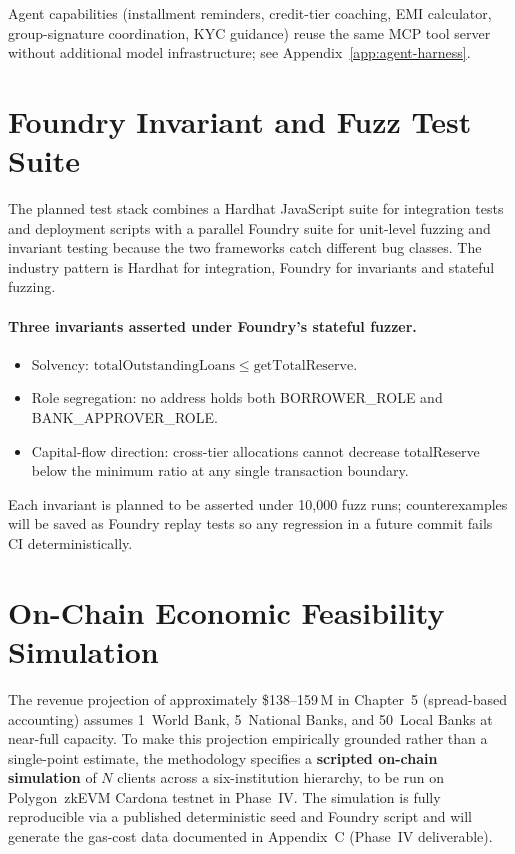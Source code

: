 \documentclass[12pt,a4paper]{report}
\begin{document}
\noindent Agent capabilities (installment reminders, credit-tier coaching, EMI calculator, group-signature coordination, KYC guidance) reuse the same MCP tool server without additional model infrastructure; see Appendix~\ref{app:agent-harness}.

\section{Foundry Invariant and Fuzz Test Suite}
\label{sec:foundry}

The planned test stack combines a Hardhat JavaScript suite for integration tests and deployment scripts with a parallel Foundry suite for unit-level fuzzing and invariant testing because the two frameworks catch different bug classes. The industry pattern is Hardhat for integration, Foundry for invariants and stateful fuzzing.

\paragraph{Three invariants asserted under Foundry's stateful fuzzer.}
\begin{itemize}[noitemsep]
\item Solvency: \(\mathrm{totalOutstandingLoans} \le \mathrm{getTotalReserve}\).
\item Role segregation: no address holds both BORROWER\_ROLE and BANK\_APPROVER\_ROLE.
\item Capital-flow direction: cross-tier allocations cannot decrease totalReserve below the minimum ratio at any single transaction boundary.
\end{itemize}

Each invariant is planned to be asserted under 10{,}000 fuzz runs; counterexamples will be saved as Foundry replay tests so any regression in a future commit fails CI deterministically.

\section{On-Chain Economic Feasibility Simulation}
\label{sec:abm-sim}

The revenue projection of approximately \$138--159\,M in Chapter~5 (spread-based accounting) assumes 1~World Bank, 5~National Banks, and 50~Local Banks at near-full capacity. To make this projection empirically grounded rather than a single-point estimate, the methodology specifies a \textbf{scripted on-chain simulation} of $N$ clients across a six-institution hierarchy, to be run on Polygon~zkEVM Cardona testnet in Phase~IV. The simulation is fully reproducible via a published deterministic seed and Foundry script and will generate the gas-cost data documented in Appendix~C (Phase~IV deliverable).
\end{document}
